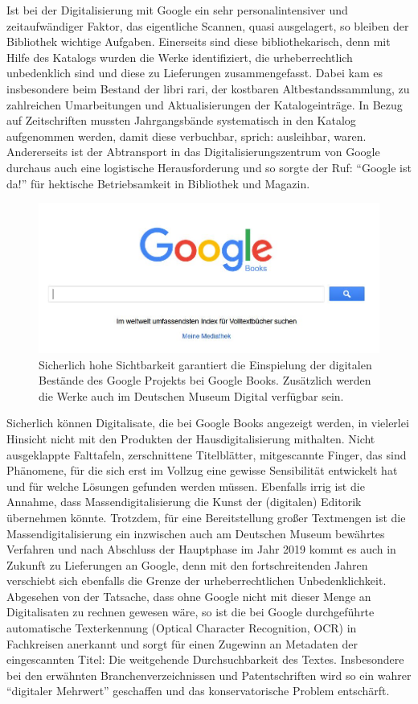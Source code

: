 \documentclass[a4paper,
fontsize=11pt,
oneside,
numbers=noperiodatend,
parskip=half-,
bibliography=totoc,
final
]{scrartcl}
\begin{document}
Ist bei der Digitalisierung mit Google ein sehr personalintensiver und
zeitaufwändiger Faktor, das eigentliche Scannen, quasi ausgelagert, so
bleiben der Bibliothek wichtige Aufgaben. Einerseits sind diese
bibliothekarisch, denn mit Hilfe des Katalogs wurden die Werke
identifiziert, die urheberrechtlich unbedenklich sind und diese zu
Lieferungen zusammengefasst. Dabei kam es insbesondere beim Bestand der
libri rari, der kostbaren Altbestandssammlung, zu zahlreichen
Umarbeitungen und Aktualisierungen der Katalogeinträge. In Bezug auf
Zeitschriften mussten Jahrgangsbände systematisch in den Katalog
aufgenommen werden, damit diese verbuchbar, sprich: ausleihbar, waren.
Andererseits ist der Abtransport in das Digitalisierungszentrum von
Google durchaus auch eine logistische Herausforderung und so sorgte der
Ruf: \enquote{Google ist da!} für hektische Betriebsamkeit in Bibliothek
und Magazin.

\begin{figure}[b!]
\centering
\includegraphics[width=.70\textwidth]{img/Abb6.jpg}
\caption{Sicherlich hohe Sichtbarkeit garantiert die Einspielung der
digitalen Bestände des Google Projekts bei Google Books. Zusätzlich
werden die Werke auch im Deutschen Museum Digital verfügbar sein.}
\end{figure}

Sicherlich können Digitalisate, die bei Google Books angezeigt werden,
in vielerlei Hinsicht nicht mit den Produkten der Hausdigitalisierung
mithalten. Nicht ausgeklappte Falttafeln, zerschnittene Titelblätter,
mitgescannte Finger, das sind Phänomene, für die sich erst im Vollzug
eine gewisse Sensibilität entwickelt hat und für welche Lösungen
gefunden werden müssen. Ebenfalls irrig ist die Annahme, dass
Massendigitalisierung die Kunst der (digitalen) Editorik übernehmen
könnte. Trotzdem, für eine Bereitstellung großer Textmengen ist die
Massendigitalisierung ein inzwischen auch am Deutschen Museum bewährtes
Verfahren und nach Abschluss der Hauptphase im Jahr 2019 kommt es auch
in Zukunft zu Lieferungen an Google, denn mit den fortschreitenden
Jahren verschiebt sich ebenfalls die Grenze der urheberrechtlichen
Unbedenklichkeit. Abgesehen von der Tatsache, dass ohne Google nicht mit
dieser Menge an Digitalisaten zu rechnen gewesen wäre, so ist die bei
Google durchgeführte automatische Texterkennung (Optical Character
Recognition, OCR) in Fachkreisen anerkannt und sorgt für einen Zugewinn
an Metadaten der eingescannten Titel: Die weitgehende Durchsuchbarkeit
des Textes. Insbesondere bei den erwähnten Branchenverzeichnissen und
Patentschriften wird so ein wahrer \enquote{digitaler Mehrwert}
geschaffen und das konservatorische Problem entschärft.
\end{document}
